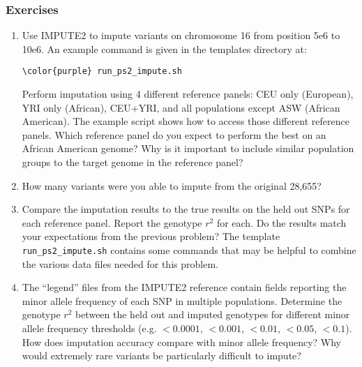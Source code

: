 \documentclass[12pt]{article}
\begin{document}
\subsubsection*{Exercises}
\begin{enumerate}

\item Use IMPUTE2 to impute variants on chromosome 16 from position 5e6 to 10e6. An example command is given in the templates directory at:
\begin{Verbatim}[commandchars=\\\{\}]
\color{purple} run_ps2_impute.sh
\end{Verbatim}
Perform imputation using 4 different reference panels: CEU only (European), YRI only (African), CEU+YRI, and all populations except ASW (African American). The example script shows how to access those different reference panels. Which reference panel do you expect to perform the best on an African American genome? Why is it important to include similar population groups to the target genome in the reference panel?

\item How many variants were you able to impute from the original 28,655?

\item Compare the imputation results to the true results on the held out SNPs for each reference panel. Report the genotype $r^2$ for each. Do the results match your expectations from the previous problem? The template \texttt{run\_ps2\_impute.sh} contains some commands that may be helpful to combine the various data files needed for this problem.

\item The ``legend'' files from the IMPUTE2 reference contain fields reporting the minor allele frequency of each SNP in multiple populations. Determine the genotype $r^2$ between the held out and imputed genotypes for different minor allele frequency thresholds (e.g. $<0.0001$, $<0.001$, $<0.01$, $<0.05$, $<0.1$). How does imputation accuracy compare with minor allele frequency? Why would extremely rare variants be particularly difficult to impute?

\end{enumerate}
\end{document}
